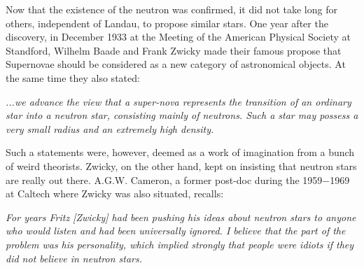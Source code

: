 Now that the existence of the neutron was confirmed, it did not take long for others, independent of Landau, to propose similar stars.
One year after the discovery, in December 1933 at the Meeting of the American Physical Society at Standford, Wilhelm Baade and Frank Zwicky made their famous propose that Supernovae should be considered as a new category of astronomical objects.\cite{Baade34a, Baade34aa}
At the same time they also stated:
\begin{displayquote}
    \textit{...we advance the view that a super-nova represents the transition of an ordinary star into a neutron star, consisting mainly of neutrons. Such a star may possess a very small radius and an extremely high density.}
\end{displayquote}
Such a statements were, however, deemed as a work of imagination from a bunch of weird theorists.
Zwicky, on the other hand, kept on insisting that neutron stars are really out there.
A.G.W. Cameron, a former post-doc during the 1959$-$1969 at Caltech where Zwicky was also situated, recalls:
\begin{displayquote}[Cameron, 1999]
    \textit{For years Fritz [Zwicky] had been pushing his ideas about neutron stars to anyone who would listen and had been universally ignored. 
    I believe that the part of the problem was his personality, which implied strongly that people were idiots if they did not believe in neutron stars.
    }
\end{displayquote}


%


